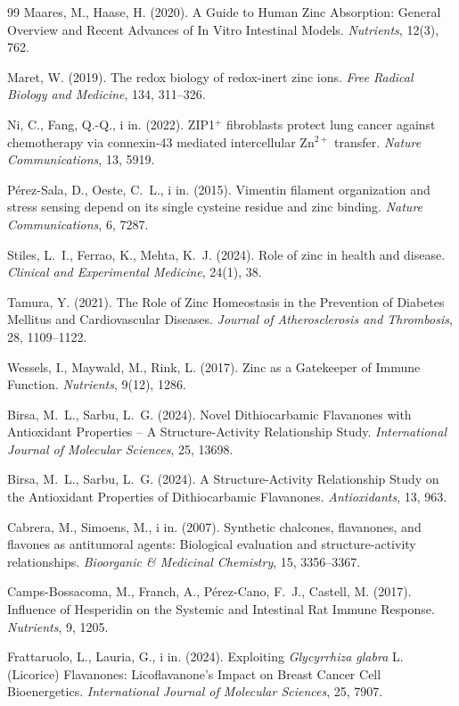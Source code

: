 \documentclass[12pt,a4paper]{article}
\begin{document}
\begin{thebibliography}{99}
Maares, M., Haase, H. (2020). A Guide to Human Zinc Absorption: General Overview and Recent Advances of In Vitro Intestinal Models. \textit{Nutrients}, 12(3), 762.

Maret, W. (2019). The redox biology of redox-inert zinc ions. \textit{Free Radical Biology and Medicine}, 134, 311--326.

Ni, C., Fang, Q.-Q., i in. (2022). ZIP1\(^+\) fibroblasts protect lung cancer against chemotherapy via connexin-43 mediated intercellular Zn\(^{2+}\) transfer. \textit{Nature Communications}, 13, 5919.

Pérez-Sala, D., Oeste, C.~L., i in. (2015). Vimentin filament organization and stress sensing depend on its single cysteine residue and zinc binding. \textit{Nature Communications}, 6, 7287.

Stiles, L.~I., Ferrao, K., Mehta, K.~J. (2024). Role of zinc in health and disease. \textit{Clinical and Experimental Medicine}, 24(1), 38.

Tamura, Y. (2021). The Role of Zinc Homeostasis in the Prevention of Diabetes Mellitus and Cardiovascular Diseases. \textit{Journal of Atherosclerosis and Thrombosis}, 28, 1109--1122.

Wessels, I., Maywald, M., Rink, L. (2017). Zinc as a Gatekeeper of Immune Function. \textit{Nutrients}, 9(12), 1286.

Birsa, M.~L., Sarbu, L.~G. (2024). Novel Dithiocarbamic Flavanones with Antioxidant Properties -- A Structure-Activity Relationship Study. \textit{International Journal of Molecular Sciences}, 25, 13698.

Birsa, M.~L., Sarbu, L.~G. (2024). A Structure-Activity Relationship Study on the Antioxidant Properties of Dithiocarbamic Flavanones. \textit{Antioxidants}, 13, 963.

Cabrera, M., Simoens, M., i in. (2007). Synthetic chalcones, flavanones, and flavones as antitumoral agents: Biological evaluation and structure-activity relationships. \textit{Bioorganic \& Medicinal Chemistry}, 15, 3356--3367.

Camps-Bossacoma, M., Franch, A., Pérez-Cano, F.~J., Castell, M. (2017). Influence of Hesperidin on the Systemic and Intestinal Rat Immune Response. \textit{Nutrients}, 9, 1205.

Frattaruolo, L., Lauria, G., i in. (2024). Exploiting \textit{Glycyrrhiza glabra} L. (Licorice) Flavanones: Licoflavanone's Impact on Breast Cancer Cell Bioenergetics. \textit{International Journal of Molecular Sciences}, 25, 7907.


\end{thebibliography}
\end{document}
